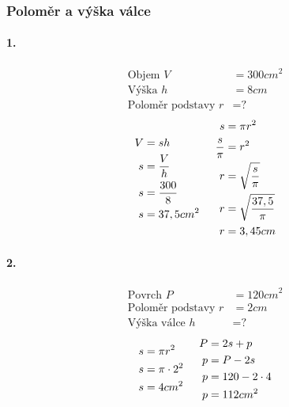 \documentclass[12pt]{article}
\begin{document}
\begin{multicols}{2}
\subsubsection{Poloměr a výška válce}
\paragraph{1.}
\begin{equation}
\begin{split}
\nonumber
\text{Objem }V&={300cm}^{2}\\
\text{Výška }h&=8cm\\
\text{Poloměr podstavy }r&=\text{?}
\end{split}
\end{equation}
\begin{equation}
\begin{split}
\nonumber
V&=sh\\
s&=\frac{V}{h}\\
s&=\frac{300}{8}\\
s&={37,5cm}^{2}
\end{split}
\hspace{0,5cm}
\begin{split}
\nonumber
s&=\pi {r}^{2}\\
\frac{s}{\pi}&={r}^{2}\\
r&=\sqrt{\frac{s}{\pi}}\\
r&=\sqrt{\frac{37,5}{\pi}}\\
r&=3,45cm
\end{split}
\end{equation}

\paragraph{2.}
\begin{equation}
\begin{split}
\nonumber
\text{Povrch }P&={120cm}^{2}\\
\text{Poloměr podstavy }r&=2cm\\
\text{Výška válce }h&=\text{?}
\end{split}
\end{equation}
\begin{equation}
\begin{split}
\nonumber
s&=\pi { r }^{ 2 }\\
s&=\pi \cdot { 2 }^{ 2 }\\
s&={ 4cm }^{ 2 }
\end{split}
\hspace{0,5cm}
\begin{split}
\nonumber
P&=2s+p\\
p&=P-2s\\
p &= 120-2 \cdot 4\\
p &= {112cm}^{2}
\end{split}
\end{equation}


\end{multicols}
\end{document}
